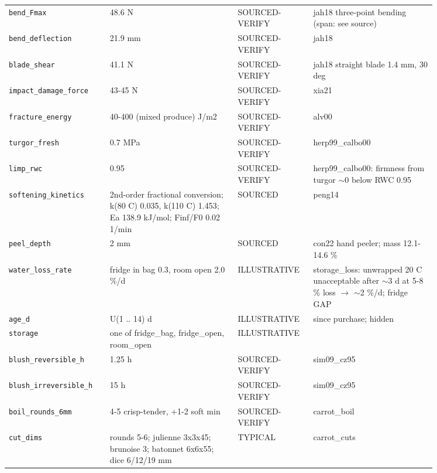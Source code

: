 \documentclass[10.5pt,a4paper]{article}
\begin{document}
{\begin{longtable}{@{}p{0.2\linewidth}p{0.27\linewidth}p{0.12\linewidth}p{0.26\linewidth}@{}}
\texttt{bend\_\allowbreak{}Fmax} & 48.6 N & SOURCED-VERIFY & jah18 three-point bending (span: see source) \\
\texttt{bend\_\allowbreak{}deflection} & 21.9 mm & SOURCED-VERIFY & jah18 \\
\texttt{blade\_\allowbreak{}shear} & 41.1 N & SOURCED-VERIFY & jah18 straight blade 1.4 mm, 30 deg \\
\texttt{impact\_\allowbreak{}damage\_\allowbreak{}force} & 43-45 N & SOURCED-VERIFY & xia21 \\
\texttt{fracture\_\allowbreak{}energy} & 40-400 (mixed produce) J/m2 & SOURCED-VERIFY & alv00 \\
\texttt{turgor\_\allowbreak{}fresh} & 0.7 MPa & SOURCED-VERIFY & herp99\_calbo00 \\
\texttt{limp\_\allowbreak{}rwc} & 0.95 & SOURCED-VERIFY & herp99\_calbo00: firmness from turgor $\sim$0 below RWC 0.95 \\
\texttt{softening\_\allowbreak{}kinetics} & 2nd-order fractional conversion; k(80 C) 0.035, k(110 C) 1.453; Ea 138.9 kJ/mol; Finf/F0 0.02 1/min & SOURCED & peng14 \\
\texttt{peel\_\allowbreak{}depth} & 2 mm & SOURCED & con22 hand peeler; mass 12.1-14.6 \% \\
\texttt{water\_\allowbreak{}loss\_\allowbreak{}rate} & fridge in bag 0.3, room open 2.0 \%/d & ILLUSTRATIVE & storage\_loss: unwrapped 20 C unacceptable after $\sim$3 d at 5-8 \% loss $\to$ $\sim$2 \%/d; fridge GAP \\
\texttt{age\_\allowbreak{}d} & U(1 .. 14) d & ILLUSTRATIVE & since purchase; hidden \\
\texttt{storage} & one of fridge\_bag, fridge\_open, room\_open & ILLUSTRATIVE &  \\
\texttt{blush\_\allowbreak{}reversible\_\allowbreak{}h} & 1.25 h & SOURCED-VERIFY & sim09\_cz95 \\
\texttt{blush\_\allowbreak{}irreversible\_\allowbreak{}h} & 15 h & SOURCED-VERIFY & sim09\_cz95 \\
\texttt{boil\_\allowbreak{}rounds\_\allowbreak{}6mm} & 4-5 crisp-tender, +1-2 soft min & SOURCED-VERIFY & carrot\_boil \\
\texttt{cut\_\allowbreak{}dims} & rounds 5-6; julienne 3x3x45; brunoise 3; batonnet 6x6x55; dice 6/12/19 mm & TYPICAL & carrot\_cuts \\\bottomrule\end{longtable}}
\end{document}

